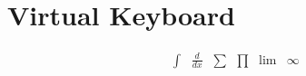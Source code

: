 \documentclass{article}
\begin{document}
    \section*{Virtual Keyboard}
    \[
    \begin{array}{cccccc}
    \int & \frac{d}{dx} & \sum & \prod & \lim & \infty \\
    \end{array}
    \]
    
\end{document}
